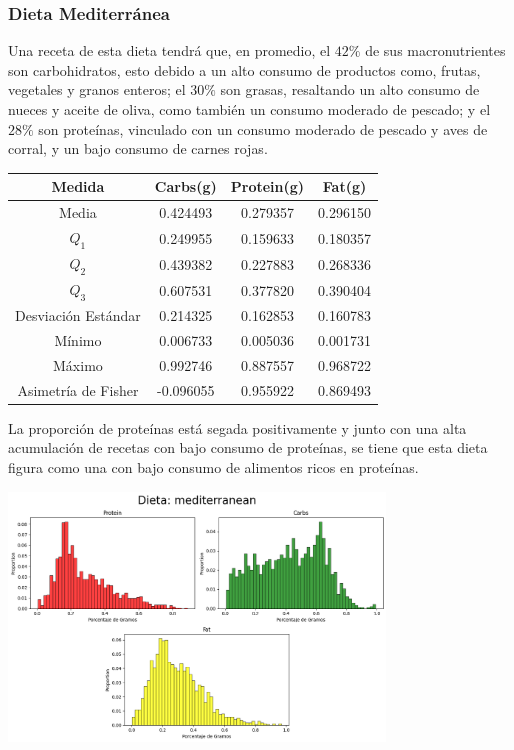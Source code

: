 \documentclass[12pt,a4paper]{article}
\begin{document}
    \subsubsection{Dieta Mediterránea}
        Una receta de esta dieta tendrá que, en promedio, el $42\%$ de sus 
        macronutrientes son carbohidratos, esto debido a un alto consumo de 
        productos como, frutas, vegetales y granos enteros; el $30\%$ son 
        grasas, resaltando un alto consumo de nueces y aceite de oliva, como 
        también un consumo moderado de pescado; y el $28\%$ son proteínas, 
        vinculado con un consumo moderado de pescado y aves de corral, y un 
        bajo consumo de carnes rojas. 
        \begin{center}
            \begin{tabular}{|c|ccc|}
                \hline
                Medida & Carbs(g) & Protein(g) & Fat(g) \\
                \hline
                Media               & 0.424493 & 0.279357 & 0.296150  \\
                $Q_1$               & 0.249955 & 0.159633 & 0.180357  \\
                $Q_2$               & 0.439382 & 0.227883 & 0.268336  \\
                $Q_3$               & 0.607531 & 0.377820 & 0.390404  \\
                Desviación Estándar & 0.214325 & 0.162853 & 0.160783  \\
                Mínimo              & 0.006733 & 0.005036 & 0.001731  \\
                Máximo              & 0.992746 & 0.887557 & 0.968722  \\
                Asimetría de Fisher & -0.096055 & 0.955922 & 0.869493 \\
                \hline
            \end{tabular}
        \end{center}
        La proporción de proteínas está segada positivamente y junto con una 
        alta acumulación de recetas con bajo consumo de proteínas, se tiene que 
        esta dieta figura como una con bajo consumo de alimentos ricos en proteínas.
        \begin{center}
            \includegraphics[width=0.75\textwidth]{Resources/2_03_plot_03.png}
        \end{center}
\end{document}
